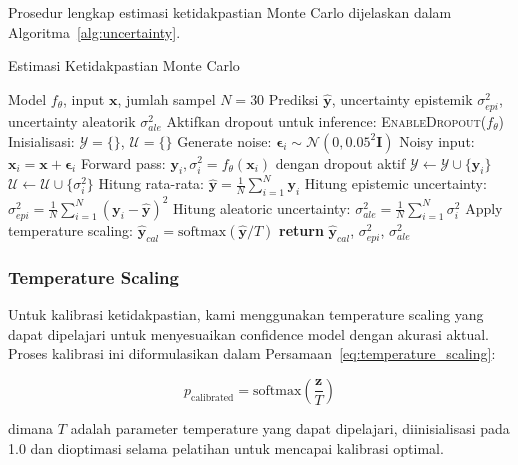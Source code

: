 Prosedur lengkap estimasi ketidakpastian Monte Carlo dijelaskan dalam Algoritma~\ref{alg:uncertainty}.

\begin{algorithm}[htbp]
\caption{Estimasi Ketidakpastian Monte Carlo}
\label{alg:uncertainty}
\begin{algorithmic}[1]
\Require Model $f_\theta$, input $\mathbf{x}$, jumlah sampel $N = 30$
\Ensure Prediksi $\hat{\mathbf{y}}$, uncertainty epistemik $\sigma_{epi}^2$, uncertainty aleatorik $\sigma_{ale}^2$
\State Aktifkan dropout untuk inference: \textsc{EnableDropout}($f_\theta$)
\State Inisialisasi: $\mathcal{Y} = \{\}$, $\mathcal{U} = \{\}$
    \State Generate noise: $\boldsymbol{\epsilon}_i \sim \mathcal{N}(0, 0.05^2 \mathbf{I})$
    \State Noisy input: $\mathbf{x}_i = \mathbf{x} + \boldsymbol{\epsilon}_i$
    \State Forward pass: $\mathbf{y}_i, \sigma_i^2 = f_\theta(\mathbf{x}_i)$ dengan dropout aktif
    \State $\mathcal{Y} \leftarrow \mathcal{Y} \cup \{\mathbf{y}_i\}$
    \State $\mathcal{U} \leftarrow \mathcal{U} \cup \{\sigma_i^2\}$
\EndFor
\State Hitung rata-rata: $\hat{\mathbf{y}} = \frac{1}{N} \sum_{i=1}^N \mathbf{y}_i$
\State Hitung epistemic uncertainty: $\sigma_{epi}^2 = \frac{1}{N} \sum_{i=1}^N (\mathbf{y}_i - \hat{\mathbf{y}})^2$
\State Hitung aleatoric uncertainty: $\sigma_{ale}^2 = \frac{1}{N} \sum_{i=1}^N \sigma_i^2$
\State Apply temperature scaling: $\hat{\mathbf{y}}_{cal} = \text{softmax}(\hat{\mathbf{y}}/T)$
\State \textbf{return} $\hat{\mathbf{y}}_{cal}$, $\sigma_{epi}^2$, $\sigma_{ale}^2$
\end{algorithmic}
\end{algorithm}

\subsubsection{Temperature Scaling}
Untuk kalibrasi ketidakpastian, kami menggunakan temperature scaling yang dapat dipelajari untuk menyesuaikan confidence model dengan akurasi aktual. Proses kalibrasi ini diformulasikan dalam Persamaan~\ref{eq:temperature_scaling}:

\begin{equation}
p_{\text{calibrated}} = \text{softmax}\left(\frac{\mathbf{z}}{T}\right)
\label{eq:temperature_scaling}
\end{equation}

dimana $T$ adalah parameter temperature yang dapat dipelajari, diinisialisasi pada 1.0 dan dioptimasi selama pelatihan untuk mencapai kalibrasi optimal.

